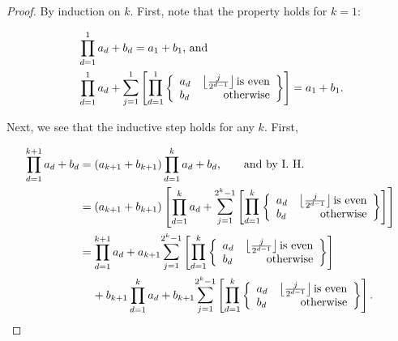 \documentclass[11pt,a4paper]{tesis}
\theoremstyle{plain}
\theoremstyle{definition}
\begin{document}
\begin{proof}
  By induction on $k$. First, note that the property holds for $k = 1$:

  \begin{equation*}
    \begin{aligned}
      & \prod_{d = 1}^{1} a_d + b_d = a_1 + b_1 \text{, and} \\
      & \prod_{d = 1}^{1} a_d + \mathlarger{\sum}_{j = 1}^{1} \left [ \mathlarger{\prod}_{d = 1}^{1}
      \left \{ \begin{array}{lr}
        a_d & \left \lfloor \frac{j}{2^{d - 1}} \right \rfloor \text{is even} \\
        b_d & \text{otherwise}
      \end{array} \right \} \right ] = a_1 + b_1 \text{.}
    \end{aligned}
  \end{equation*}

  Next, we see that the inductive step holds for any $k$. First,

  \begin{equation*}
    \begin{aligned}
      \prod_{d = 1}^{k + 1} a_d + b_d
        & = (a_{k + 1} + b_{k + 1}) \prod_{d = 1}^{k} a_d + b_d \text{, \hspace*{5mm} and by I. H.} \\
        & = (a_{k + 1} + b_{k + 1}) \left[ \prod_{d = 1}^{k} a_d + \mathlarger{\sum}_{j = 1}^{2^k - 1} \left [ \mathlarger{\prod}_{d = 1}^{k}
      \left \{ \begin{array}{lr}
        a_d & \left \lfloor \frac{j}{2^{d - 1}} \right \rfloor \text{is even} \\
        b_d & \text{otherwise}
      \end{array} \right \} \right ] \right] \\
        & = \prod_{d = 1}^{k + 1} a_d + a_{k + 1} \mathlarger{\sum}_{j = 1}^{2^k - 1} \left [ \mathlarger{\prod}_{d = 1}^{k}
        \left \{ \begin{array}{lr}
          a_d & \left \lfloor \frac{j}{2^{d - 1}} \right \rfloor \text{is even} \\
          b_d & \text{otherwise}
        \end{array} \right \} \right ] \\
        & \hspace*{4mm} + b_{k + 1} \prod_{d = 1}^{k} a_d + b_{k + 1} \mathlarger{\sum}_{j = 1}^{2^k - 1} \left [ \mathlarger{\prod}_{d = 1}^{k}
        \left \{ \begin{array}{lr}
          a_d & \left \lfloor \frac{j}{2^{d - 1}} \right \rfloor \text{is even} \\
          b_d & \text{otherwise}
        \end{array} \right \} \right ] \text{.}
    \end{aligned}
  \end{equation*}


\end{proof}
\end{document}
